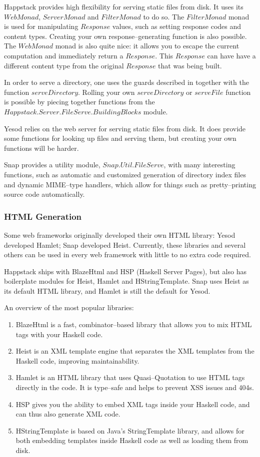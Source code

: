 Happstack provides high flexibility for serving static files from disk. It uses its $ WebMonad $, $ ServerMonad $ and $ FilterMonad $ to do so.
The $ FilterMonad $ monad is used for manipulating $ Response $ values, such as setting response codes and content types. Creating your own response--generating function is also possible.
The $ WebMonad $ monad is also quite nice: it allows you to escape the current computation and immediately return a $ Response $.
This $ Response $ can have have a different content type from the original $ Response $ that was being built.

In order to serve a directory, one uses the guards described in  together with the function $ serveDirectory $.
Rolling your own $ serveDirectory $ or $ serveFile $ function is possible by piecing together functions from the $ Happstack.Server.FileServe.BuildingBlocks $ module.

Yesod relies on the web server for serving static files from disk. It does provide some functions for looking up files and serving them, but creating your own functions will be harder.

Snap provides a utility module, $ Snap.Util.FileServe $, with many interesting functions, such as automatic and customized generation of directory index files and dynamic MIME--type handlers, which allow for things such as pretty--printing source code automatically.

\subsubsection{HTML Generation}
Some web frameworks originally developed their own HTML library: Yesod developed Hamlet; Snap developed Heist.
Currently, these libraries and several others can be used in every web framework with little to no extra code required.

Happstack ships with BlazeHtml and HSP (Haskell Server Pages), but also has boilerplate modules for Heist, Hamlet and HStringTemplate.
Snap uses Heist as its default HTML library, and Hamlet is still the default for Yesod.

An overview of the most popular libraries:

\begin{enumerate}
	\item BlazeHtml is a fast, combinator--based library that allows you to mix HTML tags with your Haskell code.
	\item Heist is an XML template engine that separates the XML templates from the Haskell code, improving maintainability.
    \item Hamlet is an HTML library that uses Quasi--Quotation to use HTML tags directly in the code. It is type--safe and helps to prevent XSS issues and 404s.
    \item HSP gives you the ability to embed XML tags inside your Haskell code, and can thus also generate XML code.
    \item HStringTemplate is based on Java's StringTemplate library, and allows for both embedding templates inside Haskell code as well as loading them from disk.
\end{enumerate}

